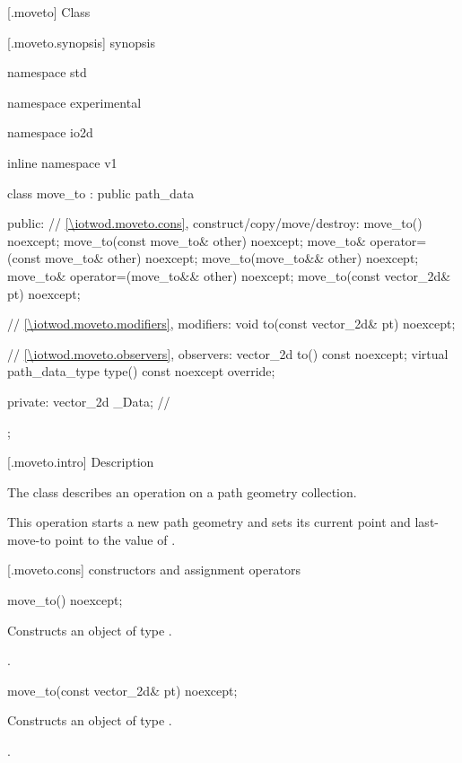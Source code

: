  [\iotwod.moveto] {Class }

 [\iotwod.moveto.synopsis] { synopsis}

\begin{codeblock}
namespace std { namespace experimental { namespace io2d { inline namespace v1 {
  class move_to : public path_data {
  public:
    // \ref{\iotwod.moveto.cons}, construct/copy/move/destroy:
    move_to() noexcept;
    move_to(const move_to& other) noexcept;
    move_to& operator=(const move_to& other) noexcept;
    move_to(move_to&& other) noexcept;
    move_to& operator=(move_to&& other) noexcept;
    move_to(const vector_2d& pt) noexcept;

    // \ref{\iotwod.moveto.modifiers}, modifiers:
    void to(const vector_2d& pt) noexcept;

    // \ref{\iotwod.moveto.observers}, observers:
    vector_2d to() const noexcept;
    virtual path_data_type type() const noexcept override;
    
  private:
    vector_2d _Data; // \expos
  };
} } } }
\end{codeblock}

 [\iotwod.moveto.intro] { Description}

\pnum
{}
The class  describes an operation on a path geometry collection.

\pnum
This operation starts a new path geometry and sets its current point and last-move-to point to the value of .

 [\iotwod.moveto.cons] { constructors and assignment operators}

\begin{itemdecl}
    move_to() noexcept;
\end{itemdecl}
\begin{itemdescr}
	\pnum
	\effects
	Constructs an object of type .
	
	\pnum
	\postconditions
	.
\end{itemdescr}

\begin{itemdecl}
    move_to(const vector_2d& pt) noexcept;
\end{itemdecl}
\begin{itemdescr}
	\pnum
	\effects
	Constructs an object of type .
	
	\pnum
	\postconditions
	.
\end{itemdescr}

